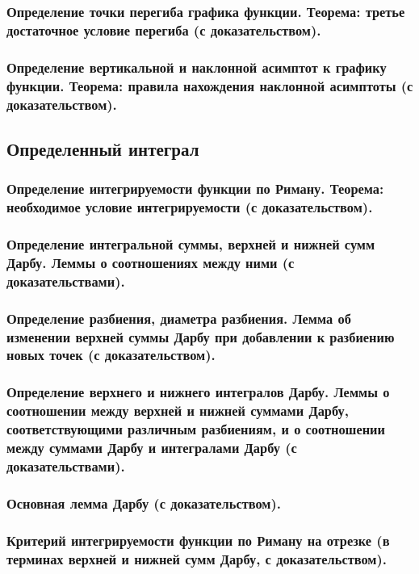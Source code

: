 \documentclass[10pt]{article}
\begin{document}
    \subsubsection{Определение точки перегиба графика функции. Теорема: третье достаточное условие перегиба (с доказательством).}
    \subsubsection{Определение вертикальной и наклонной асимптот к графику функции. Теорема: правила нахождения наклонной асимптоты (с доказательством).}
    \subsection{Определенный интеграл}
    \subsubsection{Определение интегрируемости функции по Риману. Теорема: необходимое условие интегрируемости (с доказательством).}
    \subsubsection{Определение интегральной суммы, верхней и нижней сумм Дарбу. Леммы о соотношениях между ними (с доказательствами).}
    \subsubsection{Определение разбиения, диаметра разбиения. Лемма об изменении верхней суммы Дарбу при добавлении к разбиению новых точек (с доказательством).}
    \subsubsection{Определение верхнего и нижнего интегралов Дарбу. Леммы о соотношении между верхней и нижней суммами Дарбу, соответствующими различным разбиениям, и о соотношении между суммами Дарбу и интегралами Дарбу (с доказательствами).}
    \subsubsection{Основная лемма Дарбу (с доказательством).}
    \subsubsection{Критерий интегрируемости функции по Риману на отрезке (в терминах верхней и нижней сумм Дарбу, с доказательством).}
\end{document}
